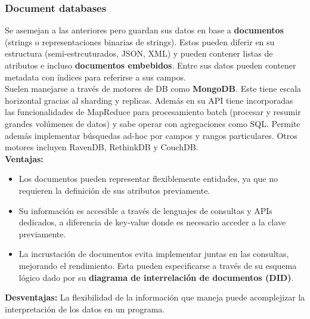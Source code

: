 \subsubsection*{Document databases}
Se asemejan a las anteriores pero guardan sus datos en base a \textbf{documentos} (strings o representaciones binarias de strings). Estos pueden diferir en su estructura (semi-estrcuturados, JSON, XML) y pueden contener listas de atributos e incluso \textbf{documentos embebidos}. Entre sus datos pueden contener metadata con índices para referirse a sus campos. \\
Suelen manejarse a través de motores de DB como \textbf{MongoDB}. Este tiene escala horizontal gracias al sharding y replicas. Además en su API tiene incorporadas las funcionalidades de MapReduce para procesamiento batch (procesar y resumir grandes volúmenes de datos) y sabe operar con agregaciones como SQL. Permite además implementar búsquedas ad-hoc por campos y rangos particulares. Otros motores incluyen RavenDB, RethinkDB y CouchDB. \\
\textbf{Ventajas:}
\begin{itemize}
    \item Los documentos pueden representar flexiblemente entidades, ya que no requieren la definición de sus atributos previamente.
    \item Su información es accesible a través de lenguajes de consultas y APIs dedicados, a diferencia de key-value donde es necesario acceder a la clave previamente.
    \item La incrustación de documentos evita implementar juntas en las consultas, mejorando el rendimiento. Esta pueden especificarse a través de su esquema lógico dado por su \textbf{diagrama de interrelación de documentos (DID)}.
\end{itemize}
\textbf{Desventajas:} La flexibilidad de la información que maneja puede acomplejizar la interpretación de los datos en un programa.

